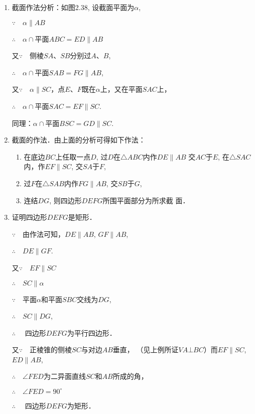 \begin{solution}
\begin{enumerate}
    \item 截面作法分析：如图2.38, 设截面平面为$\alpha$, 
    
$\because\quad \alpha\parallel AB$

$\therefore\quad \alpha\cap$平面$ABC=ED\parallel AB$

又$\because\quad $侧棱$SA$、$SB$分别过$A$、$B$,

$\therefore\quad \alpha\cap$平面$SAB=FG\parallel AB$,

又$\because\quad \alpha\parallel SC$，点$E$、$F$既在$\alpha$上，又在平面$SAC$上，

$\therefore\quad \alpha\cap$平面$SAC=EF\parallel SC$.

同理：$\alpha\cap$平面$BSC=GD\parallel SC$.

\item 截面的作法．由上面的分析可得如下作法：
\begin{enumerate}
    \item 在底边$BC$上任取一点$D$, 过$D$在$\triangle ABC$内作$DE\parallel AB$
    交$AC$于$E$, 在$\triangle SAC$内，作$EF\parallel SC$, 交$SA$于$F$,
    \item  过$F$在$\triangle SAB$内作$FG\parallel AB$, 交$SB$于$G$, 
    \item 连结$DG$, 则四边形$DEFG$所围平面部分为所求截
    面．
\end{enumerate}

\item 证明四边形$DEFG$是矩形．


$\because\quad $由作法可知，$DE\parallel AB$, $GF\parallel AB$, 

$\therefore\quad DE\parallel GF$.

又$\because\quad EF\parallel SC$

$\therefore\quad SC\parallel \alpha$

$\because\quad $平面$\alpha$和平面$SBC$交线为$DG$,

$\therefore\quad SC\parallel DG$,

$\therefore\quad$ 四边形$DEFG$为平行四边形．

又$\because\quad $正棱锥的侧棱$SC$与对边$AB$垂直，
（见上例所证$VA\bot BC$）而$EF\parallel SC$, $ED\parallel AB$,

$\therefore\quad \angle FED$为二异面直线$SC$和$AB$所成的角，

$\therefore\quad \angle FED=90^{\circ}$

$\therefore\quad $ 四边形$DEFG$为矩形．


\end{enumerate}
\end{solution}
